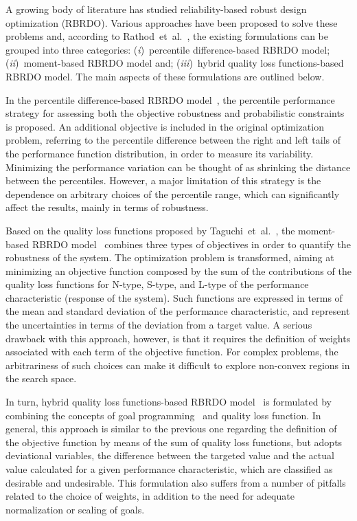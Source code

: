 \documentclass[final,5p,times,twocolumn,numbers]{elsarticle}
\begin{document}
A growing body of literature has studied reliability-based robust design optimization (RBRDO). Various approaches have been proposed to solve these problems and, according to Rathod~et~al.~\cite{bib:rathod2013}, the existing formulations can be grouped into three categories: (\textit{i})~percentile difference-based RBRDO model; (\textit{ii})~moment-based RBRDO model and; (\textit{iii})~hybrid quality loss functions-based RBRDO model. The main aspects of these formulations are outlined below.

In the percentile difference-based RBRDO model~\cite{bib:du2004}, the percentile performance strategy for assessing both the objective robustness and probabilistic constraints is proposed. An additional objective is included in the original optimization problem, referring to the percentile difference between the right and left tails of the performance function distribution, in order to measure its variability. Minimizing the performance variation can be thought of as shrinking the distance between the percentiles. However, a major limitation of this strategy is the dependence on arbitrary choices of the percentile range, which can significantly affect the results, mainly in terms of robustness.

Based on the quality loss functions proposed by Taguchi~et~al.~\cite{bib:taguchi2004}, the moment-based RBRDO model~\cite{bib:youn2005} combines three types of objectives in order to quantify the robustness of the system. The optimization problem is transformed, aiming at minimizing an objective function composed by the sum of the contributions of the quality loss functions for N-type, S-type, and L-type of the performance characteristic (response of the system). Such functions are expressed in terms of the mean and standard deviation of the performance characteristic, and represent the uncertainties in terms of the deviation from a target value. A serious drawback with this approach, however, is that it requires the definition of weights associated with each term of the objective function. For complex problems, the arbitrariness of such choices can make it difficult to explore non-convex regions in the search space.

In turn, hybrid quality loss functions-based RBRDO model~\cite{bib:yadav2010} is formulated by combining the concepts of goal programming~\cite{bib:schniederjans1995} and quality loss function. In general, this approach is similar to the previous one regarding the definition of the objective function by means of the sum of quality loss functions, but adopts deviational variables, the difference between the targeted value and the actual value calculated for a given performance characteristic, which are classified as desirable and undesirable. This formulation also suffers from a number of pitfalls related to the choice of weights, in addition to the need for adequate normalization or scaling of goals.
\end{document}
